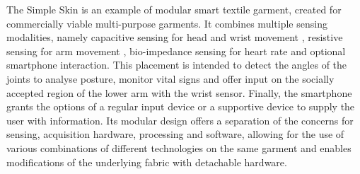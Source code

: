 \documentclass{sigchi}
\begin{document}
The Simple Skin \cite{simpleskin} is an example of modular smart textile garment, created for commercially viable multi-purpose garments. It combines multiple sensing modalities, namely capacitive sensing for head and wrist movement , resistive sensing for arm movement \cite{vogel4}, bio-impedance sensing for heart rate and optional smartphone interaction. This placement is intended to detect the angles of the joints to analyse posture, monitor vital signs and offer input on the socially accepted region of the lower arm with the wrist sensor. Finally, the smartphone grants the options of a regular input device or a supportive device to supply the user with  information. Its modular design offers a separation of the concerns for sensing, acquisition hardware, processing and software, allowing for the use of various combinations of different technologies on the same garment and enables modifications of the underlying fabric with detachable hardware. \cite{simpleskin}
\end{document}
